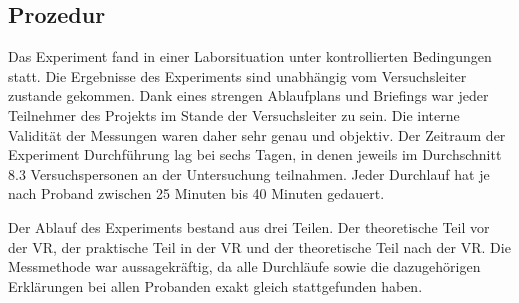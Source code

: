 \documentclass{Paper}
\begin{document}
	\subsection{Prozedur}
Das Experiment fand in einer Laborsituation unter kontrollierten Bedingungen statt. Die
Ergebnisse des Experiments sind unabhängig vom Versuchsleiter zustande gekommen. Dank
eines strengen Ablaufplans und Briefings war jeder Teilnehmer des Projekts im Stande der
Versuchsleiter zu sein. Die interne Validität der Messungen waren daher sehr genau und
objektiv. Der Zeitraum der Experiment Durchführung lag bei sechs Tagen, in denen jeweils im
Durchschnitt 8.3 Versuchspersonen an der Untersuchung teilnahmen. Jeder Durchlauf hat je
nach Proband zwischen 25 Minuten bis 40 Minuten gedauert.
\par
Der Ablauf des Experiments bestand aus drei Teilen. Der theoretische Teil vor der VR, der
praktische Teil in der VR und der theoretische Teil nach der VR. Die Messmethode war
aussagekräftig, da alle Durchläufe sowie die dazugehörigen Erklärungen bei allen Probanden
exakt gleich stattgefunden haben.
\end{document}
